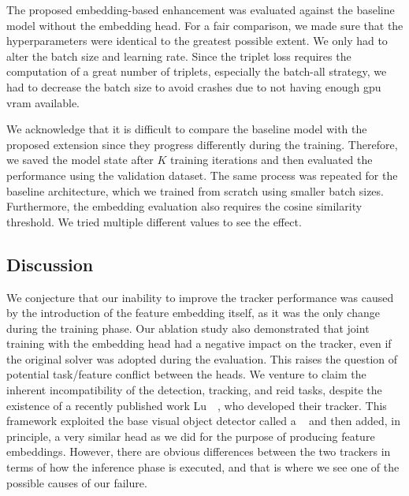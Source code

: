 The proposed embedding-based enhancement was evaluated against the baseline model without the embedding head. For a fair comparison, we made sure that the hyperparameters were identical to the greatest possible extent. We only had to alter the batch size and learning rate. Since the triplet loss requires the computation of a great number of triplets, especially the batch-all strategy, we had to decrease the batch size to avoid crashes due to not having enough \gls{gpu} \gls{vram} available.

We acknowledge that it is difficult to compare the baseline model with the proposed extension since they progress differently during the training. Therefore, we saved the model state after $K$ training iterations and then evaluated the performance using the validation dataset. The same process was repeated for the baseline architecture, which we trained from scratch using smaller batch sizes. Furthermore, the embedding evaluation also requires the cosine similarity threshold. We tried multiple different values to see the effect.


\subsection{Discussion}

We conjecture that our inability to improve the tracker performance was caused by the introduction of the feature embedding itself, as it was the only change during the training phase. Our ablation study also demonstrated that joint training with the embedding head had a negative impact on the tracker, even if the original solver was adopted during the evaluation. This raises the question of potential task/feature conflict between the heads. We venture to claim the inherent incompatibility of the detection, tracking, and \gls{reid} tasks, despite the existence of a recently published work Lu~\etal{}~\cite{lu2020retinatrack}, who developed their \retinatrack{} tracker. This framework exploited the base visual object detector called a \retinanet{}~\cite{lin2018focal} and then added, in principle, a very similar head as we did for the purpose of producing feature embeddings. However, there are obvious differences between the two trackers in terms of how the inference phase is executed, and that is where we see one of the possible causes of our failure.

